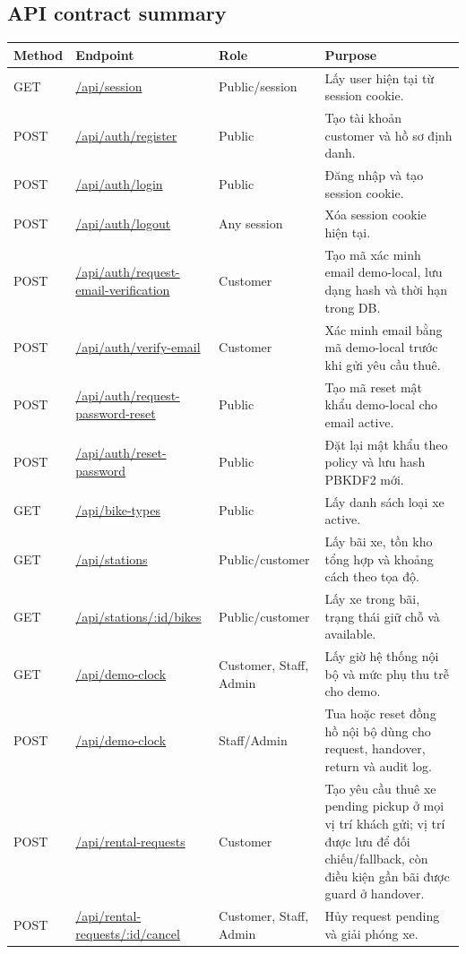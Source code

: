 \subsection{API contract summary}
\begingroup
\small
\setlength{\tabcolsep}{4pt}
\begin{longtable}{P{0.12\textwidth}P{0.35\textwidth}P{0.16\textwidth}P{0.29\textwidth}}
\toprule
\textbf{Method} & \textbf{Endpoint} & \textbf{Role} & \textbf{Purpose} \\
\midrule
GET & \url{/api/session} & Public/session & Lấy user hiện tại từ session cookie. \\
POST & \url{/api/auth/register} & Public & Tạo tài khoản customer và hồ sơ định danh. \\
POST & \url{/api/auth/login} & Public & Đăng nhập và tạo session cookie. \\
POST & \url{/api/auth/logout} & Any session & Xóa session cookie hiện tại. \\
POST & \url{/api/auth/request-email-verification} & Customer & Tạo mã xác minh email demo-local, lưu dạng hash và thời hạn trong DB. \\
POST & \url{/api/auth/verify-email} & Customer & Xác minh email bằng mã demo-local trước khi gửi yêu cầu thuê. \\
POST & \url{/api/auth/request-password-reset} & Public & Tạo mã reset mật khẩu demo-local cho email active. \\
POST & \url{/api/auth/reset-password} & Public & Đặt lại mật khẩu theo policy và lưu hash PBKDF2 mới. \\
GET & \url{/api/bike-types} & Public & Lấy danh sách loại xe active. \\
GET & \url{/api/stations} & Public/customer & Lấy bãi xe, tồn kho tổng hợp và khoảng cách theo tọa độ. \\
GET & \url{/api/stations/:id/bikes} & Public/customer & Lấy xe trong bãi, trạng thái giữ chỗ và available. \\
GET & \url{/api/demo-clock} & Customer, Staff, Admin & Lấy giờ hệ thống nội bộ và mức phụ thu trễ cho demo. \\
POST & \url{/api/demo-clock} & Staff/Admin & Tua hoặc reset đồng hồ nội bộ dùng cho request, handover, return và audit log. \\
POST & \url{/api/rental-requests} & Customer & Tạo yêu cầu thuê xe pending pickup ở mọi vị trí khách gửi; vị trí được lưu để đối chiếu/fallback, còn điều kiện gần bãi được guard ở handover. \\
POST & \url{/api/rental-requests/:id/cancel} & Customer, Staff, Admin & Hủy request pending và giải phóng xe. \\

\end{longtable}
